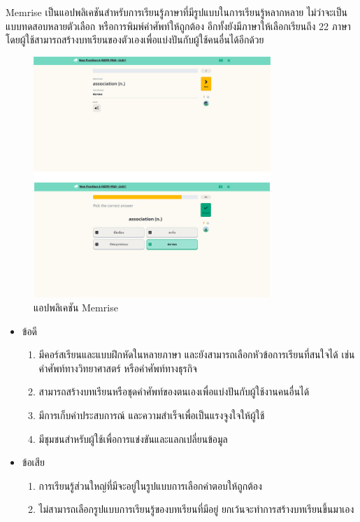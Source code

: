 \documentclass[12pt,oneside,openright,a4paper]{cpe-thai-project}
\begin{document}
\hspace{1cm}
Memrise เป็นแอปพลิเคชันสำหรับการเรียนรู้ภาษาที่มีรูปแบบในการเรียนรู้หลากหลาย ไม่ว่าจะเป็นแบบทดสอบหลายตัวเลือก
หรือการพิมพ์คำศัพท์ให้ถูกต้อง อีกทั้งยังมีภาษาให้เลือกเรียนถึง 22 ภาษา โดยผู้ใช้สามารถสร้างบทเรียนของตัวเองเพื่อแบ่งปันกับผู้ใช้คนอื่นได้อีกด้วย

\begin{figure}[!h]\centering
	\includegraphics[width=0.8\textwidth, keepaspectratio=true]{image/chap2/memriseEX.png}
	\caption{แอปพลิเคชัน Memrise}\label{fig:mimriseEx}
\end{figure}

\begin{itemize}
	\item ข้อดี
	      \begin{enumerate}
		      \item มีคอร์สเรียนและแบบฝึกหัดในหลายภาษา และยังสามารถเลือกหัวข้อการเรียนที่สนใจได้ เช่นคำศัพท์ทางวิทยาศาสตร์ หรือคำศัพท์ทางธุรกิจ
		      \item สามารถสร้างบทเรียนหรือชุดคำศัพท์ของตนเองเพื่อแบ่งปันกับผู้ใช้งานคนอื่นได้
		      \item มีการเก็บค่าประสบการณ์ และความสำเร็จเพื่อเป็นแรงจูงใจให้ผู้ใช้
		      \item มีชุมชนสำหรับผู้ใช้เพื่อการแข่งขันและแลกเปลี่ยนข้อมูล
	      \end{enumerate}
	\item ข้อเสีย
	      \begin{enumerate}
		      \item การเรียนรู้ส่วนใหญ่ที่มีจะอยู่ในรูปแบบการเลือกคำตอบให้ถูกต้อง
		      \item ไม่สามารถเลือกรูปแบบการเรียนรู้ของบทเรียนที่มีอยู่ ยกเว้นจะทำการสร้างบทเรียนขึ้นมาเอง
	      \end{enumerate}
\end{itemize}
\end{document}

